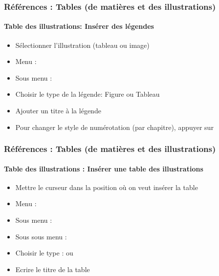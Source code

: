 \documentclass[xcolor=table]{beamer}
\begin{document}
\begin{frame}[t]
\frametitle{Références : Tables (de matières et des illustrations)}
\framesubtitle{Table des illustrations: Insérer des légendes}

\begin{minipage}{0.66\textwidth}
\begin{itemize}
	\item Sélectionner l'illustration (tableau ou image)
	\item Menu : 
	\item Sous menu : 
	\item Choisir le type de la légende: Figure ou Tableau
	\item Ajouter un titre à la légende
	\item Pour changer le style de numérotation (par chapitre), appuyer sur 
\end{itemize}
\end{minipage}
\begin{minipage}{0.33\textwidth}


\end{minipage}

\end{frame}

\begin{frame}[t]
\frametitle{Références : Tables (de matières et des illustrations)}
\framesubtitle{Table des illustrations : Insérer une table des illustrations}

\begin{itemize}
	\item Mettre le curseur dans la position où on veut insérer la table
	\item Menu : 
	\item Sous menu : 
\end{itemize}
\begin{minipage}{0.39\textwidth}
\begin{itemize}
	\item Sous sous menu : 
	\item Choisir le type :  ou 
	\item Ecrire le titre de la table
\end{itemize}
\end{minipage}
\begin{minipage}{0.60\textwidth}
\end{minipage}

\end{frame}
\end{document}
